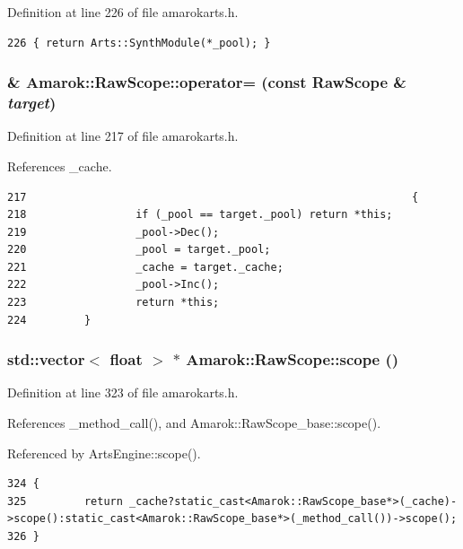 Definition at line 226 of file amarokarts.h.



\footnotesize\begin{verbatim}226 { return Arts::SynthModule(*_pool); }
\end{verbatim}\normalsize 
{}
\subsubsection{\& Amarok::Raw\-Scope::operator= (const {\bf Raw\-Scope} \& {\em target})\hspace{0.3cm}{\tt  [inline]}}\label{classAmarok_1_1RawScope_Amarok_1_1RawScopea6}




Definition at line 217 of file amarokarts.h.

References \_\-cache.



\footnotesize\begin{verbatim}217                                                            {
218                 if (_pool == target._pool) return *this;
219                 _pool->Dec();
220                 _pool = target._pool;
221                 _cache = target._cache;
222                 _pool->Inc();
223                 return *this;
224         }
\end{verbatim}\normalsize 
{}
\subsubsection{\setlength{\rightskip}{0pt plus 5cm}std::vector$<$ float $>$ $\ast$ Amarok::Raw\-Scope::scope ()\hspace{0.3cm}{\tt  [inline]}}\label{classAmarok_1_1RawScope_Amarok_1_1RawScopea18}




Definition at line 323 of file amarokarts.h.

References \_\-method\_\-call(), and Amarok::Raw\-Scope\_\-base::scope().

Referenced by Arts\-Engine::scope().



\footnotesize\begin{verbatim}324 {
325         return _cache?static_cast<Amarok::RawScope_base*>(_cache)->scope():static_cast<Amarok::RawScope_base*>(_method_call())->scope();
326 }
\end{verbatim}\normalsize 


